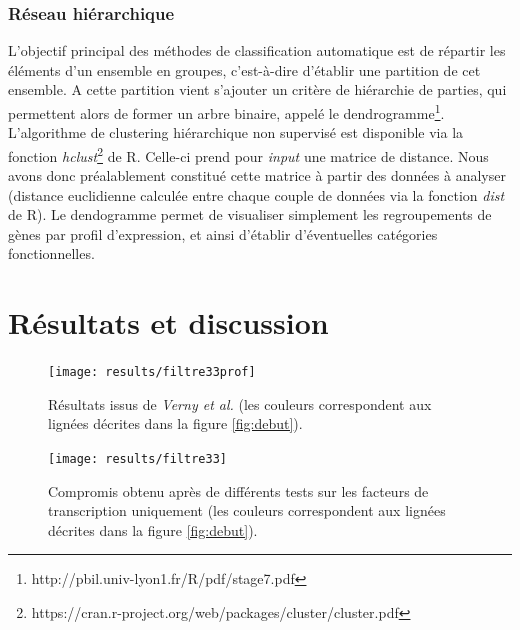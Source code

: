 \documentclass[fleqn,11pt]{SelfArx} %
\begin{document}
\subsubsection{Réseau hiérarchique}
L’objectif principal des méthodes de classification automatique est de répartir les éléments d’un ensemble en groupes, c'est-à-dire d’établir une partition de cet ensemble.
A cette partition vient s'ajouter un critère de hiérarchie de parties, qui permettent alors de former un arbre binaire, appelé le dendrogramme\footnote{http://pbil.univ-lyon1.fr/R/pdf/stage7.pdf}. L'algorithme de clustering hiérarchique non supervisé est disponible via la fonction \textit{hclust}\footnote{https://cran.r-project.org/web/packages/cluster/cluster.pdf} de R. Celle-ci prend pour \textit{input} une matrice de distance. Nous avons donc préalablement constitué cette matrice à partir des données à analyser (distance euclidienne calculée entre chaque couple de données via la fonction \textit{dist} de R). Le dendogramme permet de visualiser simplement les regroupements de gènes par profil d'expression, et ainsi d'établir d'éventuelles catégories fonctionnelles.




\section{Résultats et discussion}

\begin{figure}[ht]
\centering
\texttt{[image: results/filtre33prof]}
\caption{Résultats issus de \textit{Verny et al.} (les couleurs correspondent aux lignées décrites dans la figure \ref{fig:debut}).}
\label{fig:filtre33prof}
\end{figure}


\begin{figure}[ht]
\centering
\texttt{[image: results/filtre33]}
\caption{Compromis obtenu après de différents tests sur les facteurs de transcription uniquement (les couleurs correspondent aux lignées décrites dans la figure \ref{fig:debut}).}
\label{fig:filtre33}
\end{figure}
\end{document}

